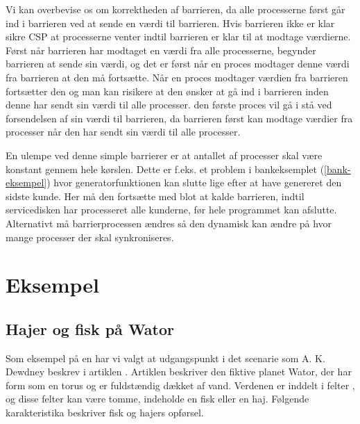 Vi kan overbevise os om korrektheden af barrieren, da alle processerne først går ind i barrieren ved at sende en værdi til barrieren. Hvis barrieren ikke er klar sikre CSP at processerne venter indtil barrieren er klar til at modtage værdierne. Først når barrieren har modtaget en værdi fra alle processerne, begynder barrieren at sende sin værdi, og det er først når en proces modtager denne værdi fra barrieren at den må fortsætte. Når en proces modtager værdien fra barrieren fortsætter den og man kan risikere at den ønsker at gå ind i barrieren inden denne har sendt sin værdi til alle processer. den første proces vil gå i stå ved forsendelsen af sin værdi til barrieren, da barrieren først kan modtage værdier fra processer når den har sendt sin værdi til alle processer.

En ulempe ved denne simple barrierer er at antallet af processer skal være konstant gennem hele kørslen.
Dette er f.eks. et problem i bankeksemplet (\cref{bank-eksempel}) hvor generatorfunktionen kan slutte lige efter at have genereret den sidste kunde. Her må den fortsætte med blot at kalde barrieren, indtil servicedisken har processeret alle kunderne, før hele programmet kan afslutte. Alternativt må barrierprocessen ændres så den dynamisk kan ændre på hvor mange processer der skal synkroniseres. 


\section{Eksempel}


\subsection{Hajer og fisk på Wator} Som eksempel på en \des har vi valgt at 
udgangspunkt i det scenarie som A. K. Dewdney
beskrev i artiklen \cite{wator}. Artiklen beskriver den
fiktive planet Wator, der har form som en torus og er fuldstændig
dækket af vand. Verdenen er inddelt i felter \cite[20]{wator}, og disse felter kan være tomme, indeholde en
fisk eller en haj. Følgende karakteristika beskriver fisk og hajers
opførsel.

